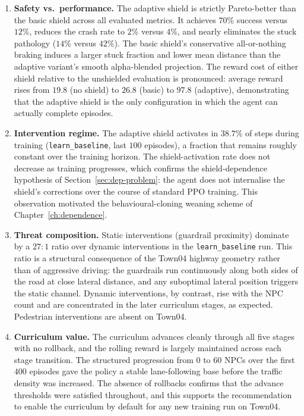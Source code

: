 \begin{enumerate}
  \item \textbf{Safety vs.\ performance.} The adaptive shield is strictly Pareto-better than
        the basic shield across all evaluated metrics. It achieves \(70\%\) success versus
        \(12\%\), reduces the crash rate to \(2\%\) versus \(4\%\), and nearly eliminates
        the stuck pathology (\(14\%\) versus \(42\%\)). The basic shield's conservative
        all-or-nothing braking induces a larger stuck fraction and lower mean distance than
        the adaptive variant's smooth alpha-blended projection. The reward cost of either
        shield relative to the unshielded evaluation is pronounced: average reward rises from
        \(19.8\) (no shield) to \(26.8\) (basic) to \(97.8\) (adaptive), demonstrating that
        the adaptive shield is the only configuration in which the agent can actually complete
        episodes.

  \item \textbf{Intervention regime.} The adaptive shield activates in \(38.7\%\) of steps
        during training (\texttt{learn\_baseline}, last \(100\) episodes), a fraction that
        remains roughly constant over the training horizon. The shield-activation rate does not
        decrease as training progresses, which confirms the shield-dependence
        hypothesis of Section~\ref{sec:dep-problem}: the agent does not internalise the
        shield's corrections over the course of standard PPO training. This observation
        motivated the behavioural-cloning weaning scheme of Chapter~\ref{ch:dependence}.

  \item \textbf{Threat composition.} Static interventions (guardrail proximity) dominate
        by a \(27{:}1\) ratio over dynamic interventions in the \texttt{learn\_baseline}
        run. This ratio is a structural consequence of the Town04 highway geometry rather
        than of aggressive driving: the guardrails run continuously along both sides of the
        road at close lateral distance, and any suboptimal lateral position triggers the
        static channel. Dynamic interventions, by contrast, rise with the NPC count and are
        concentrated in the later curriculum stages, as expected. Pedestrian interventions
        are absent on Town04.

  \item \textbf{Curriculum value.} The curriculum advances cleanly through all five stages
        with no rollback, and the rolling reward is largely maintained across each stage
        transition. The structured progression from \(0\) to \(60\) NPCs over the first
        \(400\) episodes gave the policy a stable lane-following base before the traffic
        density was increased. The absence of rollbacks confirms that the advance thresholds
        were satisfied throughout, and this supports the recommendation to enable the
        curriculum by default for any new training run on Town04.
\end{enumerate}

